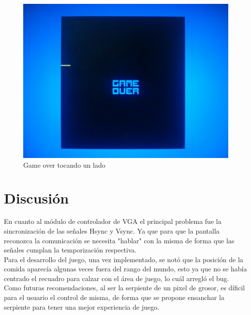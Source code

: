 \documentclass[10pt]{article}
\begin{document}
\begin{figure}[hbtp]
\centering
\includegraphics[width=1\textwidth]{game-over-side}
\caption{Game over tocando un lado}
\label{vga-over-side}
\end{figure}

\section{Discusión}
En cuanto al módulo de controlador de VGA el principal problema fue la sincronización de las señales Hsync y Vsync. Ya que para que la pantalla reconozca la comunicación se necesita "hablar" con la misma de forma que las señales cumplan la temporización respectiva. \\
Para el desarrollo del juego, una vez implementado, se notó que la posición de la comida aparecía algunas veces fuera del rango del mundo, esto ya que no se había centrado el recuadro para calzar con el área de juego, lo cuál arregló el bug.\\
Como futuras recomendaciones, al ser la serpiente de un pixel de grosor, es díficil para el usuario el control de misma, de forma que se propone ensanchar la serpiente para tener una mejor experiencia de juego. 
\end{document}

